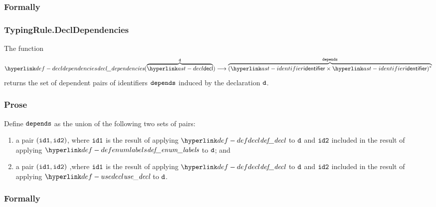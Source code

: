 \subsubsection{Formally}
\begin{mathpar}
\end{mathpar}

\subsubsection{TypingRule.DeclDependencies \label{sec:TypingRule.DeclDependencies}}
\hypertarget{def-decldependencies}{}
The function
\[
\decldependencies(\overname{\decl}{\vd}) \aslto \overname{(\identifier\times\identifier)^*}{\dependencies}
\]
returns the set of dependent pairs of identifiers $\dependencies$ induced by the declaration $\vd$.

\subsubsection{Prose}
Define $\dependencies$ as the union of the following two sets of pairs:
\begin{enumerate}
  \item a pair $(\idone, \idtwo)$, where $\idone$ is the result of applying $\defdecl$ to $\vd$
        and $\idtwo$ included in the result of applying $\defenumlabels$ to $\vd$; and
  \item a pair $(\idone, \idtwo)$ ,where $\idone$ is the result of applying $\defdecl$ to $\vd$
        and $\idtwo$ included in the result of applying $\usedecl$ to $\vd$.
\end{enumerate}

\subsubsection{Formally}
\begin{mathpar}
\end{mathpar}

